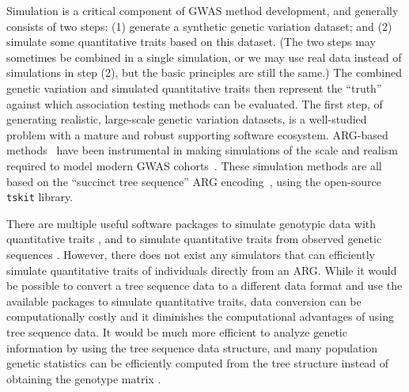 \documentclass[unnumsec,webpdf,modern,large,namedate]{oup-authoring-template}%
\begin{document}
Simulation is a critical component of GWAS method development, and
generally consists of two steps: (1) generate a synthetic genetic
variation dataset; and (2) simulate some quantitative traits
based on this dataset.
(The two steps may sometimes be combined
in a single simulation, or we may use real data instead of simulations in
step (2), but the basic principles are still the same.)
The combined genetic variation and
simulated quantitative traits then represent the ``truth'' against
which association testing methods can be evaluated.
The first step, of generating realistic, large-scale genetic variation
datasets, is a well-studied problem with a mature and robust supporting
software ecosystem. ARG-based methods~\citep{kelleher2016efficient,
kelleher2018efficient,haller2018tree,baumdicker2022efficient,anderson2023}
have been instrumental in making simulations of the scale and realism
required to model modern GWAS cohorts~\cite[e.g.][]{martin2017,zaidi2020}.
These simulation methods are all based on the ``succinct tree
sequence'' ARG encoding~\citep{kelleher2019,ralph2020,wong2023general},
using the open-source \texttt{tskit} library.




There are multiple useful software packages to simulate genotypic data with
quantitative traits \citep{gaynor2021,haller2023}, and to simulate quantitative
traits from observed genetic sequences \citep{fernandes2020,meyer2018}.
However, there does not exist any simulators that can efficiently simulate
quantitative traits of individuals directly from an ARG. While it would be
possible to convert a tree sequence data to a different data format and use the
available packages to simulate quantitative traits, data conversion can be
computationally costly and it diminishes the computational advantages of using
tree sequence data. It would be much more efficient to analyze genetic
information by using the tree sequence data structure, and many population
genetic statistics can be efficiently computed from the tree structure instead
of obtaining the genotype matrix \citep{ralph2020}.
\end{document}
